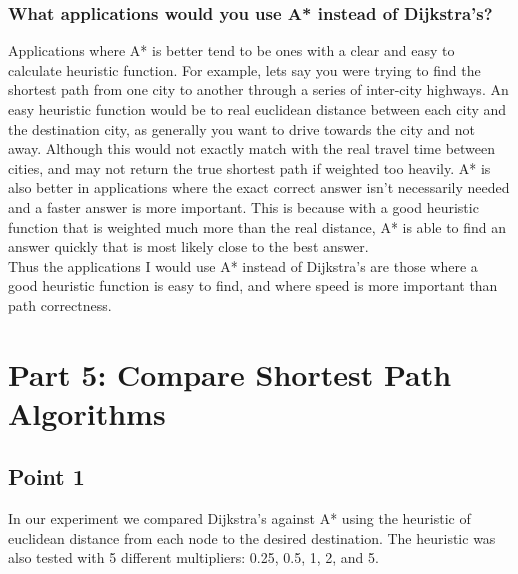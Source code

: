\documentclass[12pt]{article}
\begin{document}
\subsubsection*{What applications would you use A* instead of Dijkstra’s?}
Applications where A* is better tend to be ones with a clear and easy to calculate heuristic function. For example, lets say you were
trying to find the shortest path from one city to another through a series of inter-city highways. An easy heuristic function would 
be to real euclidean distance between each city and the destination city, as generally you want to drive towards the city and not away. 
Although this would not exactly match with the real travel time between cities, and may not return the true shortest path if weighted
too heavily. A* is also better in applications where the exact correct answer isn't necessarily needed and a faster answer is
more important. This is because with a good heuristic function that is weighted much more than the real distance, A* is able to find
an answer quickly that is most likely close to the best answer. \\
Thus the applications I would use A* instead of Dijkstra's are those where a good heuristic function is easy to find, and where speed is more important
than path correctness.

\newpage
\section*{Part 5: Compare Shortest Path Algorithms}
\subsection*{Point 1}
In our experiment we compared Dijkstra’s against A* using the heuristic of euclidean distance from 
each node to the desired destination. The heuristic was also tested with 5 different multipliers: 0.25, 0.5, 1, 2, and 5.
\end{document}
